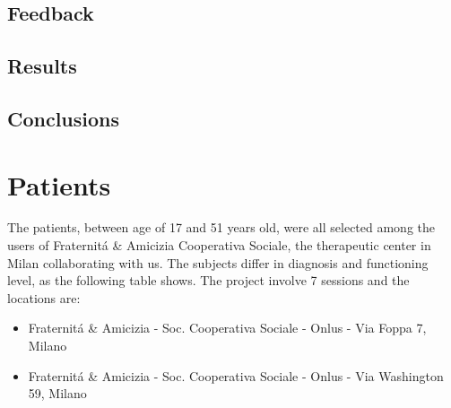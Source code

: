 \subsection{Feedback}
\subsection{Results}
\subsection{Conclusions}

\section{Patients}
The patients, between age of 17 and 51 years old, were all selected among the users of Fraternit\'a \& Amicizia Cooperativa Sociale, the therapeutic center in Milan collaborating with us. The subjects differ in diagnosis and functioning level, as the following table shows. The project involve 7 sessions and the locations are:
\begin{itemize}
\item Fraternit\'a \& Amicizia - Soc. Cooperativa Sociale - Onlus - Via Foppa 7, Milano
\item Fraternit\'a \& Amicizia - Soc. Cooperativa Sociale - Onlus - Via Washington 59, Milano
\end{itemize} 
